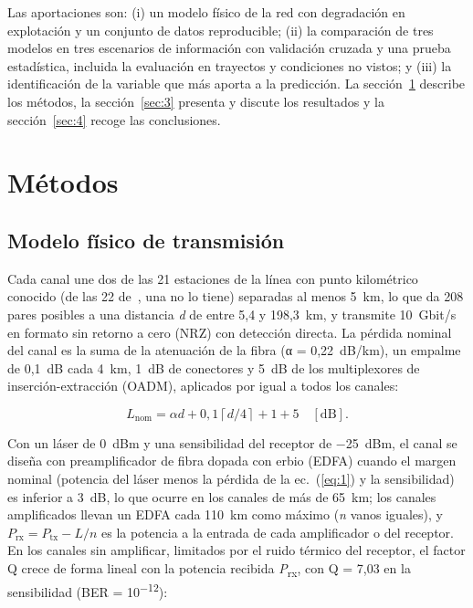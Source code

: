 \documentclass[runningheads]{llncs}
\begin{document}
Las aportaciones son: (i) un modelo físico de la red con degradación en explotación y un conjunto de datos reproducible; (ii) la comparación de tres modelos en tres escenarios de información con validación cruzada y una prueba estadística, incluida la evaluación en trayectos y condiciones no vistos; y (iii) la identificación de la variable que más aporta a la predicción. La sección~\ref{sec:2} describe los métodos, la sección~\ref{sec:3} presenta y discute los resultados y la sección~\ref{sec:4} recoge las conclusiones.


\section{Métodos}\label{sec:2}


\subsection{Modelo físico de transmisión}

Cada canal une dos de las 21 estaciones de la línea con punto kilométrico conocido (de las 22 de~\cite{acosta2026tfg}, una no lo tiene) separadas al menos 5~km, lo que da 208 pares posibles a una distancia \emph{d} de entre 5,4 y 198,3~km, y transmite 10~Gbit/s en formato sin retorno a cero (NRZ) con detección directa. La pérdida nominal del canal es la suma de la atenuación de la fibra (α = 0,22~dB/km), un empalme de 0,1~dB cada 4~km, 1~dB de conectores y 5~dB de los multiplexores de inserción-extracción (OADM), aplicados por igual a todos los canales:

\begin{equation}
L_{\mathrm{nom}} = \alpha d + 0{,}1\left\lceil d/4 \right\rceil + 1 + 5 \quad [\mathrm{dB}] .
\label{eq:1}
\end{equation}

Con un láser de 0~dBm y una sensibilidad del receptor de −25~dBm, el canal se diseña con preamplificador de fibra dopada con erbio (EDFA) cuando el margen nominal (potencia del láser menos la pérdida de la ec.~(\ref{eq:1}) y la sensibilidad) es inferior a 3~dB, lo que ocurre en los canales de más de 65~km; los canales amplificados llevan un EDFA cada 110~km como máximo (\emph{n} vanos iguales), y $P_{\mathrm{rx}} = P_{\mathrm{tx}} - L/n$ es la potencia a la entrada de cada amplificador o del receptor. En los canales sin amplificar, limitados por el ruido térmico del receptor, el factor Q crece de forma lineal con la potencia recibida \emph{P}\textsubscript{rx}, con Q = 7,03 en la sensibilidad (BER = 10\textsuperscript{−12}):
\end{document}
